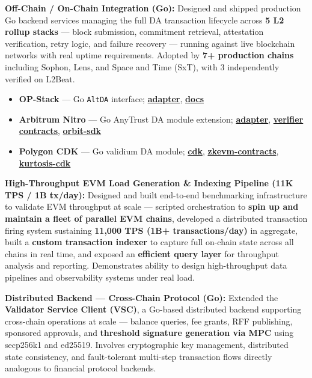 \documentclass[letterpaper,11pt]{article}
\newcommand{\resumeItem}[1]{
  \item\small{{#1 \vspace{-2pt}}}
}
\begin{document}
   \resumeItem{\textbf{Off-Chain / On-Chain Integration (Go):} Designed and shipped production Go backend services managing the full DA transaction lifecycle across \textbf{5 L2 rollup stacks} — block submission, commitment retrieval, attestation verification, retry logic, and failure recovery — running against live blockchain networks with real uptime requirements. Adopted by \textbf{7+ production chains} including Sophon, Lens, and Space and Time (SxT), with 3 independently verified on L2Beat.}
    \begin{itemize}
      \item \textbf{OP-Stack} — Go \texttt{AltDA} interface; \href{https://github.com/availproject/avail-op-stack-adapter}{\textbf{adapter}}, \href{https://docs.availproject.org/docs/build-with-avail/deploy-rollup-on-avail/Optimium/op-stack/op-stack}{\textbf{docs}}
      \item \textbf{Arbitrum Nitro} — Go AnyTrust DA module extension; \href{https://github.com/availproject/avail-nitro-adapter}{\textbf{adapter}}, \href{https://github.com/availproject/nitro-contracts}{\textbf{verifier contracts}}, \href{https://github.com/availproject/arbitrum-orbit-sdk}{\textbf{orbit-sdk}}
      \item \textbf{Polygon CDK} — Go validium DA module; \href{https://github.com/availproject/cdk}{\textbf{cdk}}, \href{https://github.com/availproject/cdk-zkevm-contracts}{\textbf{zkevm-contracts}}, \href{https://github.com/availproject/kurtosis-cdk}{\textbf{kurtosis-cdk}}
    \end{itemize}
    
    \resumeItem{\textbf{High-Throughput EVM Load Generation \& Indexing Pipeline (11K TPS / 1B tx/day):} Designed and built end-to-end benchmarking infrastructure to validate EVM throughput at scale — scripted orchestration to \textbf{spin up and maintain a fleet of parallel EVM chains}, developed a distributed transaction firing system sustaining \textbf{11,000 TPS (1B+ transactions/day)} in aggregate, built a \textbf{custom transaction indexer} to capture full on-chain state across all chains in real time, and exposed an \textbf{efficient query layer} for throughput analysis and reporting. Demonstrates ability to design high-throughput data pipelines and observability systems under real load.}

   \resumeItem{\textbf{Distributed Backend — Cross-Chain Protocol (Go):} Extended the \textbf{Validator Service Client (VSC)}, a Go-based distributed backend supporting cross-chain operations at scale — balance queries, fee grants, RFF publishing, sponsored approvals, and \textbf{threshold signature generation via MPC} using secp256k1 and ed25519. Involves cryptographic key management, distributed state consistency, and fault-tolerant multi-step transaction flows directly analogous to financial protocol backends.}
\end{document}
